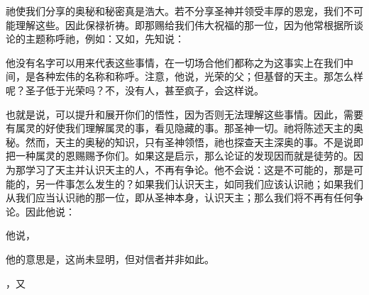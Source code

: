 祂使我们分享的奥秘和秘密真是浩大。若不分享圣神并领受丰厚的恩宠，我们不可能理解这些。因此保禄祈祷。即那赐给我们伟大祝福的那一位，因为他常根据所谈论的主题称呼祂，例如：又如，先知说：\par

\par

他没有名字可以用来代表这些事情，在一切场合他们都称之为这事实上在我们中间，是各种宏伟的名称和称呼。注意，他说，光荣的父；但基督的天主。那怎么样呢？圣子低于光荣吗？不，没有人，甚至疯子，会这样说。\par

\par

也就是说，可以提升和展开你们的悟性，因为否则无法理解这些事情。因此，需要有属灵的好使我们理解属灵的事，看见隐藏的事。那圣神一切。祂将陈述天主的奥秘。然而，天主的奥秘的知识，只有圣神领悟，祂也探查天主深奥的事。不是说即把一种属灵的恩赐赐予你们。如果这是启示，那么论证的发现因而就是徒劳的。因为那学习了天主并认识天主的人，不再有争论。他不会说：这是不可能的，那是可能的，另一件事怎么发生的？如果我们认识天主，如同我们应该认识祂；如果我们从我们应当认识祂的那一位，即从圣神本身，认识天主；那么我们将不再有任何争论。因此他说：\par

\par

\par

他说，\par

他的意思是，这尚未显明，但对信者并非如此。\par

，又\par

